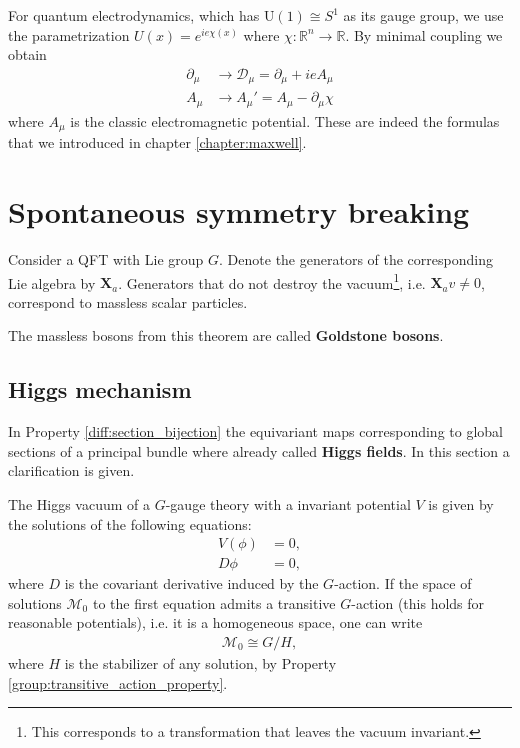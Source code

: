     \begin{example}[QED]
        For quantum electrodynamics, which has U$(1)\cong S^1$ as its gauge group, we use the parametrization $U(x) = e^{ie\chi(x)}$ where $\chi:\mathbb{R}^n\rightarrow\mathbb{R}$. By minimal coupling we obtain
        \begin{align}
            \partial_\mu &\longrightarrow \mathcal{D}_\mu = \partial_\mu + ieA_\mu\\
            A_\mu &\longrightarrow A_\mu' = A_\mu - \partial_\mu\chi
        \end{align}
        where $A_\mu$ is the classic electromagnetic potential. These are indeed the formulas that we introduced in chapter \ref{chapter:maxwell}.
    \end{example}

\section{Spontaneous symmetry breaking}

    \begin{theorem}[Goldstone]
        Consider a QFT with Lie group $G$. Denote the generators of the corresponding Lie algebra by $\mathbf{X}_a$. Generators that do not destroy the vacuum\footnote{This corresponds to a transformation that leaves the vacuum invariant.}, i.e. $\mathbf{X}_av\neq0$, correspond to massless scalar particles.
    \end{theorem}
    The massless bosons from this theorem are called \textbf{Goldstone bosons}.

\subsection{Higgs mechanism}

    In Property \ref{diff:section_bijection} the equivariant maps corresponding to global sections of a principal bundle where already called \textbf{Higgs fields}. In this section a clarification is given.

    The Higgs vacuum of a $G$-gauge theory with a invariant potential $V$ is given by the solutions of the following equations:
    \begin{align}
        V(\phi) &= 0,\\
        D\phi &= 0,
    \end{align}
    where $D$ is the covariant derivative induced by the $G$-action. If the space of solutions $\mathcal{M}_0$ to the first equation admits a transitive $G$-action (this holds for reasonable potentials), i.e. it is a homogeneous space, one can write
    \begin{gather}
        \mathcal{M}_0\cong G/H,
    \end{gather}
    where $H$ is the stabilizer of any solution, by Property \ref{group:transitive_action_property}.

